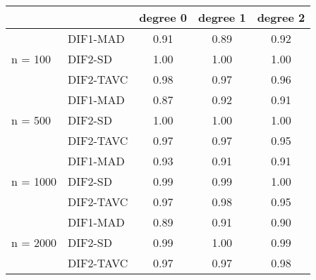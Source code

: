 \begin{tabular}{|l|l|c|c|c|}
  \hline
 &  & degree 0 & degree 1 & degree 2 \\ 
  \hline
 & DIF1-MAD & 0.91 & 0.89 & 0.92 \\ 
  n = 100 & DIF2-SD & 1.00 & 1.00 & 1.00 \\ 
   & DIF2-TAVC & 0.98 & 0.97 & 0.96 \\ 
   & DIF1-MAD & 0.87 & 0.92 & 0.91 \\ 
  n = 500 & DIF2-SD & 1.00 & 1.00 & 1.00 \\ 
   & DIF2-TAVC & 0.97 & 0.97 & 0.95 \\ 
   & DIF1-MAD & 0.93 & 0.91 & 0.91 \\ 
  n = 1000 & DIF2-SD & 0.99 & 0.99 & 1.00 \\ 
   & DIF2-TAVC & 0.97 & 0.98 & 0.95 \\ 
   & DIF1-MAD & 0.89 & 0.91 & 0.90 \\ 
  n = 2000 & DIF2-SD & 0.99 & 1.00 & 0.99 \\ 
   & DIF2-TAVC & 0.97 & 0.97 & 0.98 \\ 
   \hline
\end{tabular}
